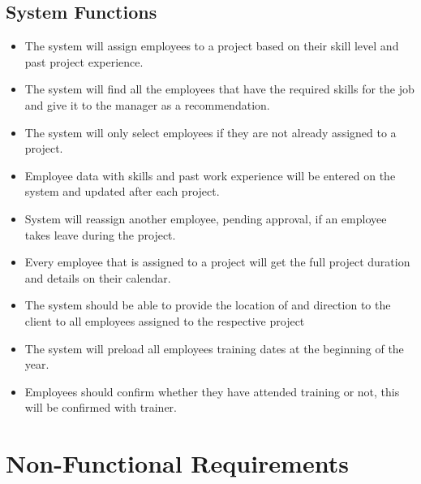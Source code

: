 \documentclass{article}
\begin{document}
		\subsection{System Functions}
    	\begin{itemize}
        	\item The system will assign employees to a project based
    	        on their skill level and past project experience. 
    	    \item The system will find all the employees that have the required skills     for the job and give it to the manager as a recommendation.
    	    \item The system will only select employees if they are not already           assigned to a project.
    	    \item Employee data with skills and past work experience
		        will be entered on the system and updated after each project. 
		    \item System will reassign another employee, pending 
		        approval, if an employee takes leave during the project.
    	    \item Every employee that is assigned to a project will get
		        the full project duration and details on their calendar. 
		    \item The system should be able to provide the location of and direction      to the client to all employees assigned to the respective project
		    \item The system will preload all employees training dates
		        at the beginning of the year. 
		    \item Employees should confirm whether they have attended training or not,     this will be confirmed with trainer. 
    	\end{itemize}
  
  \section{Non-Functional Requirements}
\end{document}
